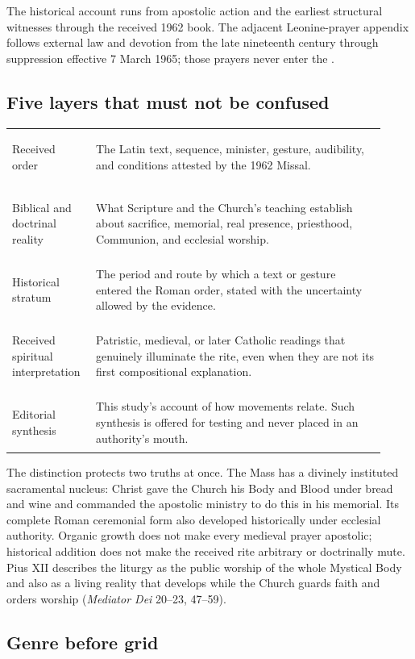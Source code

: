 {The historical account runs from apostolic action and the earliest structural witnesses through the received 1962 book. The adjacent Leonine-prayer appendix follows external law and devotion from the late nineteenth century through suppression effective 7 March 1965; those prayers never enter the .

\subsection{Five layers that must not be confused}

\begin{longtable}{>{\bfseries\raggedright\arraybackslash}p{0.19\linewidth}>{\raggedright\arraybackslash}p{0.73\linewidth}}
Received order & The Latin text, sequence, minister, gesture, audibility, and conditions attested by the 1962 Missal.\\
Biblical and doctrinal reality & What Scripture and the Church's teaching establish about sacrifice, memorial, real presence, priesthood, Communion, and ecclesial worship.\\
Historical stratum & The period and route by which a text or gesture entered the Roman order, stated with the uncertainty allowed by the evidence.\\
Received spiritual interpretation & Patristic, medieval, or later Catholic readings that genuinely illuminate the rite, even when they are not its first compositional explanation.\\
Editorial synthesis & This study's account of how movements relate. Such synthesis is offered for testing and never placed in an authority's mouth.\\
\end{longtable}

The distinction protects two truths at once. The Mass has a divinely instituted sacramental nucleus: Christ gave the Church his Body and Blood under bread and wine and commanded the apostolic ministry to do this in his memorial. Its complete Roman ceremonial form also developed historically under ecclesial authority. Organic growth does not make every medieval prayer apostolic; historical addition does not make the received rite arbitrary or doctrinally mute. Pius XII describes the liturgy as the public worship of the whole Mystical Body and also as a living reality that develops while the Church guards faith and orders worship (\emph{Mediator Dei} 20--23, 47--59).

\subsection{Genre before grid}

}
